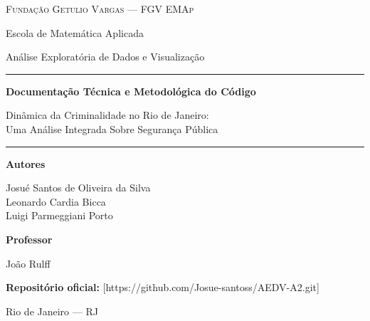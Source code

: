 \documentclass[11pt,a4paper]{article}
\begin{document}
\begin{titlepage}
  \centering
  \vspace*{1.2cm}

  {\scshape\large Fundação Getulio Vargas --- FGV EMAp\par}
  \vspace{0.25cm}
  {\normalsize Escola de Matemática Aplicada\par}
  \vspace{0.15cm}
  {\normalsize Análise Exploratória de Dados e Visualização \par}

  \vspace{3.0cm}

  \rule{\linewidth}{0.8pt}\par
  \vspace{0.6cm}
  {\LARGE\bfseries Documentação Técnica e Metodológica do Código\par}
  \vspace{0.45cm}
  {\large Dinâmica da Criminalidade no Rio de Janeiro:\\
  Uma Análise Integrada Sobre Segurança Pública\par}
  \vspace{0.6cm}
  \rule{\linewidth}{0.8pt}\par

  \vspace{2.6cm}

  {\normalsize\textbf{Autores}\par}
  \vspace{0.3cm}
  {\normalsize
    Josué Santos de Oliveira da Silva\\
    Leonardo Cardia Bicca\\
    Luigi Parmeggiani Porto\par
  }

  \vspace{1.2cm}

  {\normalsize\textbf{Professor}\par}
  \vspace{0.2cm}
  {\normalsize João Rulff\par}

  \vfill

  {\small\textbf{Repositório oficial:} [https://github.com/Josue-santoss/AEDV-A2.git]\par}
  \vspace{0.3cm}
  {\small Rio de Janeiro --- RJ\par}
\end{titlepage}
\end{document}
